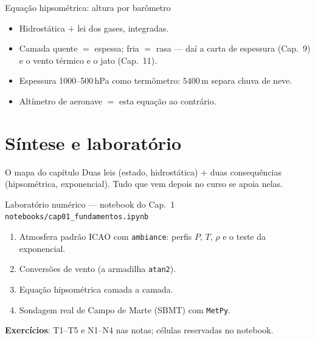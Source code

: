 \documentclass[aspectratio=169,11pt]{beamer}
\begin{document}
\begin{frame}{Equação hipsométrica: altura por barômetro}
  \vspace{0.5em}
  \begin{itemize}
    \item Hidrostática $+$ lei dos gases, integradas.
    \item \alert{Camada quente $=$ espessa; fria $=$ rasa} — daí a carta
          de espessura (Cap.~9) e o vento térmico e o jato (Cap.~11).
    \item Espessura 1000--500\,hPa como termômetro: $5400$\,m separa chuva
          de neve.
    \item Altímetro de aeronave $=$ esta equação ao contrário.
  \end{itemize}
\end{frame}

\section{Síntese e laboratório}

\begin{frame}{O mapa do capítulo}
  \vspace{0.6em}
  Duas leis (estado, hidrostática) $+$ duas consequências (hipsométrica,
  exponencial). Tudo que vem depois no curso se apoia nelas.
\end{frame}

\begin{frame}{Laboratório numérico --- notebook do Cap.~1}
  \texttt{notebooks/cap01\_fundamentos.ipynb}
  \begin{enumerate}
    \item Atmosfera padrão ICAO com \texttt{ambiance}: perfis $P$, $T$,
          $\rho$ e o teste da exponencial.
    \item Conversões de vento (a armadilha \texttt{atan2}).
    \item Equação hipsométrica camada a camada.
    \item Sondagem real de Campo de Marte (SBMT) com \texttt{MetPy}.
  \end{enumerate}
  \vspace{0.4em}
  \textbf{Exercícios}: T1--T5 e N1--N4 nas notas; células reservadas no
  notebook.
  \vfill
  \atribuicao
\end{frame}
\end{document}

